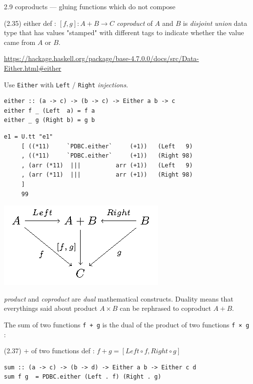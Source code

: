 \documentclass[presentation]{beamer}
\begin{document}
\begin{frame}[fragile,label=sec-8]{2.9 coproducts --- gluing functions which do not compose}
 \begin{block}{(2.35) either def : $[f,g] : A + B \rightarrow C$}
\emph{coproduct} of $A$ and $B$ is \emph{disjoint union} data type that has
values "stamped" with different tags to indicate whether the value
came from $A$ or $B$.

\url{https://hackage.haskell.org/package/base-4.7.0.0/docs/src/Data-Either.html#either}

Use \texttt{Either} with \texttt{Left} / \texttt{Right} \emph{injections}.

\begin{verbatim}
either :: (a -> c) -> (b -> c) -> Either a b -> c
either f _ (Left  a) = f a
either _ g (Right b) = g b
\end{verbatim}

\begin{verbatim}
e1 = U.tt "e1"
     [ ((*11)     `PDBC.either`     (+1))   (Left   9)
     , ((*11)     `PDBC.either`     (+1))   (Right 98)
     , (arr (*11)  |||          arr (+1))   (Left   9)
     , (arr (*11)  |||          arr (+1))   (Right 98)
     ]
     99
\end{verbatim}

\includegraphics[width=.9\linewidth]{./either.png}

\emph{product} and \emph{coproduct} are \emph{dual} mathematical constructs.  Duality
means that everythings said about product $A \times B$ can be rephrased to
coproduct $A + B$.

The sum of two functions \texttt{f + g} is the dual of the product of two functions \texttt{f × g} :
\end{block}

\begin{block}{(2.37) $+$ of two functions def : $f + g = [Left \circ f, Right \circ g]$}
\begin{verbatim}
sum :: (a -> c) -> (b -> d) -> Either a b -> Either c d
sum f g  = PDBC.either (Left . f) (Right . g)
\end{verbatim}


\end{block}
\end{frame}
\end{document}
